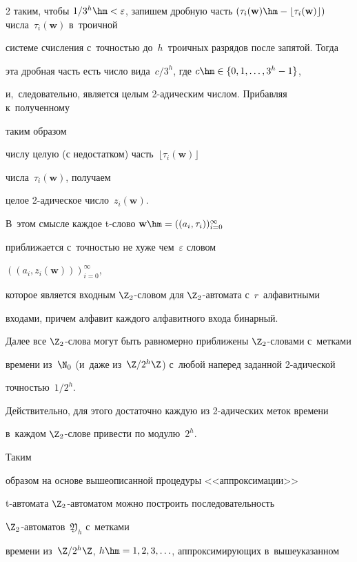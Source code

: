 \begin{multicols}{2}
таким, чтобы $1/3^{h}\hm<\varepsilon$, запишем дроб\-ную часть $(\tau_i(\mathbf w)


\hm-\lfloor\tau_i(\mathbf w)\rfloor)$ чис\-ла~$\tau_i(\mathbf w)$  в~троичной


сис\-те\-ме счис\-ле\-ния с~точ\-ностью до~$h$~троичных разрядов после запятой. Тогда


эта дроб\-ная часть есть чис\-ло вида~$c/3^h$, где $c\hm\in\{0,1,\ldots,3^h-1\}$,


и,~следовательно, является целым 2-ади\-че\-ским чис\-лом. Прибавляя к~полученному


таким образом


числу   целую (с недостатком) часть~$\lfloor\tau_i(\mathbf w)\rfloor$


числа~$\tau_i(\mathbf w)$, получаем


целое 2-ади\-че\-ское число~$z_i(\mathbf w)$. 


В~этом смысле каждое t-сло\-во $\mathbf w\hm= ((a_i,\tau_i))_{i=0}^\infty$ 


приближается с~точ\-ностью не хуже чем~$\varepsilon$ словом 


$((a_i,z_i(\mathbf w)))_{i=0}^\infty$,


которое является входным $\Z_2$-сло\-вом для $\Z_2$-ав\-то\-ма\-та с~$r$~алфавитными


входами, причем алфавит каждого алфавитного входа бинарный.





Далее все $\Z_2$-сло\-ва могут быть равномерно приближены $\Z_2$-сло\-ва\-ми с~метками


времени из~$\N_0$ (и~даже из~$\Z/2^h\Z$) с~любой наперед заданной 2-ади\-че\-ской 


точ\-ностью~$1/2^h$.


Действительно, для этого достаточно каждую из 2-ади\-че\-ских меток времени 


в~каждом $\Z_2$-сло\-ве привести по модулю~$2^h$.


 Таким\linebreak


  образом на основе вышеописанной процедуры <<аппроксимации>> 


 t-ав\-то\-ма\-та $\Z_2$-ав\-то\-ма\-том можно постро\-ить  последовательность 


 $\Z_2$-ав\-то\-ма\-тов~$\mathfrak Y_h$ с~метками


времени из~$\Z/2^h\Z$, $h\hm=1,2,3,\ldots$, аппроксимирующих в~вышеуказанном 



\end{multicols}
